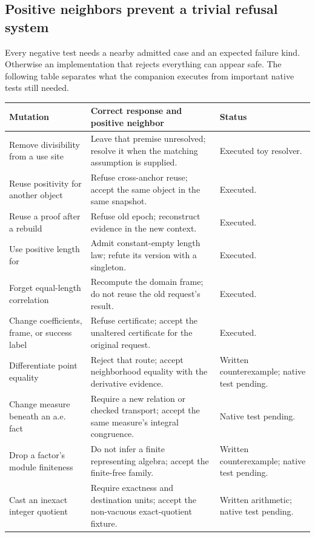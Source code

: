 \documentclass[11pt,letterpaper]{article}
\newcommand{\code}[1]{\texttt{\detokenize{#1}}}
\theoremstyle{definition}\newtheorem{definition}[theorem]{Definition}
\theoremstyle{remark}\newtheorem{remark}[theorem]{Remark}
\begin{document}
\subsection{Positive neighbors prevent a trivial refusal system}
Every negative test needs a nearby admitted case and an expected failure kind.
Otherwise an implementation that rejects everything can appear safe. The
following table separates what the companion executes from important native
tests still needed.
\begin{center}\small
\begin{tabularx}{\textwidth}{@{}P{0.29\textwidth}Y P{0.20\textwidth}@{}}
\toprule Mutation & Correct response and positive neighbor & Status\\\midrule
Remove divisibility from a use site & Leave that premise unresolved; resolve it
when the matching assumption is supplied. & Executed toy resolver.\\
Reuse positivity for another object & Refuse cross-anchor reuse; accept the same
object in the same snapshot. & Executed.\\
Reuse a proof after a rebuild & Refuse old epoch; reconstruct evidence in the new
context. & Executed.\\
Use positive length for \code{List Empty} & Admit constant-empty length law;
refute its \code{List Nat} version with a singleton. & Executed.\\
Forget equal-length correlation & Recompute the domain frame; do not reuse the
old request's result. & Executed.\\
Change coefficients, frame, or success label & Refuse certificate; accept the
unaltered certificate for the original request. & Executed.\\
Differentiate point equality & Reject that route; accept neighborhood equality
with the derivative evidence. & Written counterexample; native test pending.\\
Change measure beneath an a.e. fact & Require a new relation or checked transport;
accept the same measure's integral congruence. & Native test pending.\\
Drop a factor's module finiteness & Do not infer a finite representing algebra;
accept the finite-free family. & Written counterexample; native test pending.\\
Cast an inexact integer quotient & Require exactness and destination units;
accept the non-vacuous exact-quotient fixture. & Written arithmetic; native test pending.\\
\bottomrule
\end{tabularx}
\end{center}
\end{document}
